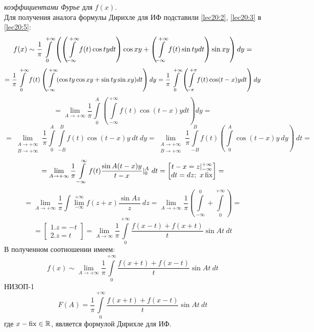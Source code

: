 \documentclass[../../main.tex]{subfiles}
\begin{document}
\emph{коэффициентами Фурье} для $ f(x) $.\\
Для получения аналога формулы Дирихле для ИФ подставили
\eqref{lec20:2}, \eqref{lec20:3} в \eqref{lec20:5}:
\[
f(x) \sim \dfrac{1}{\pi} \int\limits_{0}^{+\infty}
\left(
\left(\int\limits_{-\infty}^{+\infty} f(t) \cos ty dt\right) \cos xy +
\left(
\int\limits_{-\infty}^{+\infty} f(t) \sin ty dt
\right) \sin xy 
\right) dy = \] \[ =
\dfrac{1}{\pi}
\int\limits_{0}^{+\infty} f(t) \left(
\int\limits_{-\infty}^{+\infty} (\cos ty\cos xy + \sin ty\sin xy) dt
\right) dy =
\dfrac{1}{\pi} \int\limits_{0}^{+\infty} \left(
\int\limits_{-\pi}^{+\pi} f(t) \cos(t - x)ydt
\right) dy \] \[ =
\lim\limits_{A \to +\infty} \dfrac{1}{\pi}
\int\limits_0^{A} \left(
\int\limits_{-\infty}^{+\infty}
f(t) \cos(t - x)ydt
\right) dy =
\] \[ = 
\lim\limits_{\substack{A \to +\infty \\ B \to +\infty}} \dfrac{1}{\pi}
\int\limits_0^A \int\limits_{-B}^B f(t) \cos(t-x)y\ dt\ dy =
\lim\limits_{\substack{A \to +\infty \\ B \to +\infty}}
\dfrac{1}{\pi} \int\limits_{-B}^B f(t) \left(
\int\limits_0^A
 \cos (t - x) y\ dy \right)\ dt =
\] \[ = 
\lim\limits_{A \to +\infty} \dfrac{1}{\pi}
\int\limits_{-\infty}^{\infty} f(t) 
\dfrac{\sin A(t - x)y}{t - x}|_0^A\ dt = 
\begin{bmatrix}
t - x = z |_{-\infty}^{+\infty}\\
dt = dz;\ x \operatorname{fix}
\end{bmatrix} =
\] \[ = 
\lim\limits_{A \to +\infty} \dfrac{1}{\pi} 
\int\lim\limits_{-\infty}^{+\infty} f(z + x)
\dfrac{\sin Az}{z}\ dz =
\lim\limits_{A \to +\infty} \dfrac{1}{\pi}
\left(
\int\limits_{-\infty}^{0} + 
\int\limits_{0}^{+\infty}
\right) =
\] \[ = 
\begin{bmatrix}
1. z = -t \\
2. z = t
\end{bmatrix} =
\lim\limits_{A \to \infty} \dfrac{1}{\pi}
\int\limits_{0}^{+\infty}
\dfrac{f(x - t) + f(x + t)}{t} \sin At\ dt
\]
В полученном соотношении имеем:
\begin{equation}
\label{lec20:6}
	f(x) \sim \lim\limits_{A \to +\infty} \dfrac{1}{\pi} 
	\int\limits_0^{+\infty} \dfrac{f(x + t) + f(x - t)}{t} \sin At\ dt
\end{equation}
НИЗОП-1
\begin{equation}
\label{lec20:7}
	F(A) = \dfrac{1}{\pi} \int\limits_0^{+\infty} 
	\dfrac{f(x + t) + f(x - t)}{t} \sin At\ dt
\end{equation}
где $ x - \operatorname{fix} \in \mathbb{R} $, является формулой Дирихле для ИФ.
\end{document}
